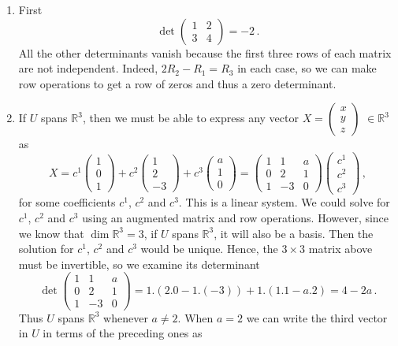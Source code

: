 \begin{enumerate}
\item First 
\[\det\begin{pmatrix}1&2\\3&4\end{pmatrix}=-2\, .\]
All the other determinants vanish because the first three rows of each matrix are not independent. 
Indeed, $2R_2-R_1=R_3$ in each case, so we can make row operations to get a row of zeros and thus a zero determinant. 

\item If $U$ spans ${\mathbb R}^3$, then we must be able to express any vector $X=\begin{pmatrix}x\\y\\z\end{pmatrix}$ $\in {\mathbb R}^3$
as
\[
X=c^1\begin{pmatrix}1\\0\\1\end{pmatrix}+c^2\begin{pmatrix}1\\2\\-3\end{pmatrix}+c^3\begin{pmatrix}a\\1\\0\end{pmatrix}
=\begin{pmatrix}1&1&a\\0&2&1\\1&-3&0\end{pmatrix}\begin{pmatrix}c^1\\c^2\\c^3\end{pmatrix}\, ,
\]
for some coefficients $c^1$, $c^2$ and $c^3$. This is a linear system. We could solve for $c^1$, $c^2$ and $c^3$ using an
augmented matrix and row operations. However, since we know that $\dim{\mathbb R}^3=3$, if $U$ spans ${\mathbb R}^3$,
it will also be a basis. Then the solution for  $c^1$, $c^2$ and $c^3$ would be unique. Hence, the $3\times 3$ matrix above must 
be invertible, so we examine its determinant
\[
\det\begin{pmatrix}1&1&a\\0&2&1\\1&-3&0\end{pmatrix}
=1.(2.0-1.(-3))+1.(1.1-a.2)=4-2a\, .
\]
Thus $U$ spans ${\mathbb R}^3$ whenever $a\neq 2$. When $a=2$ we can write the third vector in $U$ in terms of the preceding ones as

\end{enumerate}
